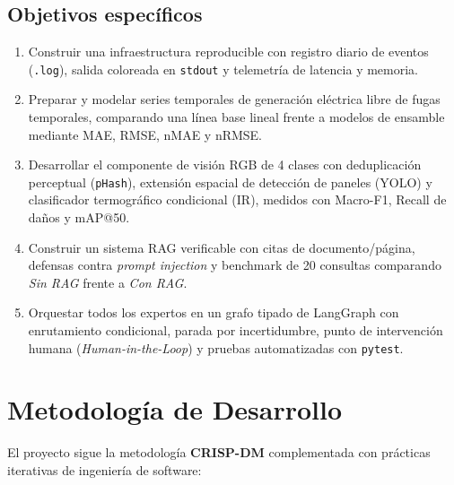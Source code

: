 \documentclass[12pt,a4paper]{article}
\begin{document}
\subsection{Objetivos específicos}
\begin{enumerate}
    \item Construir una infraestructura reproducible con registro diario de eventos (\texttt{.log}), salida coloreada en \texttt{stdout} y telemetría de latencia y memoria.
    \item Preparar y modelar series temporales de generación eléctrica libre de fugas temporales, comparando una línea base lineal frente a modelos de ensamble mediante MAE, RMSE, nMAE y nRMSE.
    \item Desarrollar el componente de visión RGB de 4 clases con deduplicación perceptual (\texttt{pHash}), extensión espacial de detección de paneles (YOLO) y clasificador termográfico condicional (IR), medidos con Macro-F1, Recall de daños y mAP@50.
    \item Construir un sistema RAG verificable con citas de documento/página, defensas contra \textit{prompt injection} y benchmark de 20 consultas comparando \textit{Sin RAG} frente a \textit{Con RAG}.
    \item Orquestar todos los expertos en un grafo tipado de LangGraph con enrutamiento condicional, parada por incertidumbre, punto de intervención humana (\textit{Human-in-the-Loop}) y pruebas automatizadas con \texttt{pytest}.
\end{enumerate}

\section{Metodología de Desarrollo}

El proyecto sigue la metodología \textbf{CRISP-DM} complementada con prácticas iterativas de ingeniería de software:
\end{document}
